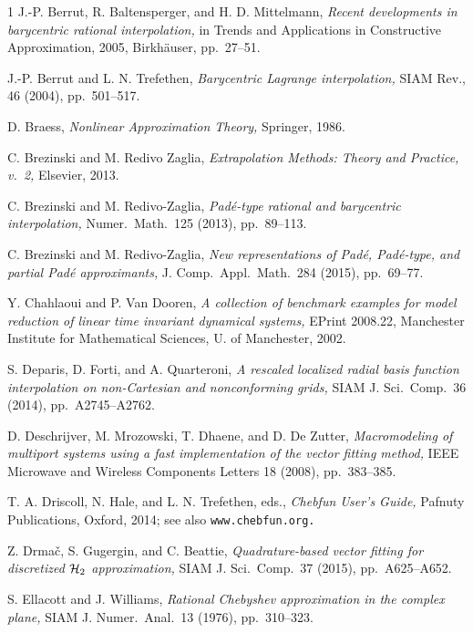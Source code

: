 \documentclass[final]{siamltex}
\begin{document}
\begin{thebibliography}{1}
{\sc J.-P. Berrut, R. Baltensperger, and H. D. Mittelmann,}
{\em Recent developments in barycentric rational interpolation,} in
Trends and Applications in Constructive Approximation, 2005,
Birkh\"auser, pp.~27--51.

{\sc J.-P. Berrut and L. N. Trefethen,}
{\em Barycentric Lagrange interpolation,}
SIAM Rev., 46 (2004), pp.~501--517.

{\sc D. Braess,} {\em Nonlinear Approximation Theory,} Springer, 1986.

{\sc C. Brezinski and M. Redivo Zaglia,}
{\em Extrapolation Methods: Theory and Practice, v.~2,}
Elsevier, 2013.

{\sc C. Brezinski and M. Redivo-Zaglia,}
{\em Pad\'e-type rational and barycentric
interpolation,} Numer.\ Math.\ 125 (2013), pp.~89--113.

{\sc C. Brezinski and M. Redivo-Zaglia,}
{\em New representations of Pad\'e, Pad\'e-type, and partial
Pad\'e approximants,} J. Comp.\ Appl.\ Math.\ 284 (2015), pp.~69--77.

{\sc Y. Chahlaoui and P. Van Dooren,}
{\em A collection of benchmark examples for model
reduction of linear time invariant dynamical systems,}
EPrint 2008.22, Manchester Institute for Mathematical
Sciences, U. of Manchester, 2002.

{\sc S. Deparis, D. Forti, and A. Quarteroni,}
{\em A rescaled localized radial basis function interpolation
on non-Cartesian and nonconforming grids,}
SIAM J. Sci.\ Comp.\ 36 (2014), pp.~A2745--A2762.

{\sc D. Deschrijver, M. Mrozowski, T. Dhaene, and
D. De Zutter,} {\em Macromodeling of multiport systems using
a fast implementation of the vector fitting method,}
IEEE Microwave and Wireless Components Letters 18
(2008), pp.~383--385.

{\sc T. A. Driscoll, N. Hale, and L. N. Trefethen,}
eds., {\em Chebfun User's Guide,} Pafnuty Publications, Oxford, 2014; see
also {\tt www.chebfun.org.}

{\sc Z. Drma\v c, S. Gugergin, and C. Beattie,} {\em Quadrature-based vector
fitting for discretized ${\cal H}_2$ approximation,}
SIAM J. Sci.\ Comp.\ 37 (2015), pp.~A625--A652.

{\sc S. Ellacott and J. Williams,}
{\em Rational Chebyshev approximation in the complex plane,}
SIAM J. Numer.\ Anal.\ 13 (1976), pp.~310--323.


\end{thebibliography}
\end{document}
